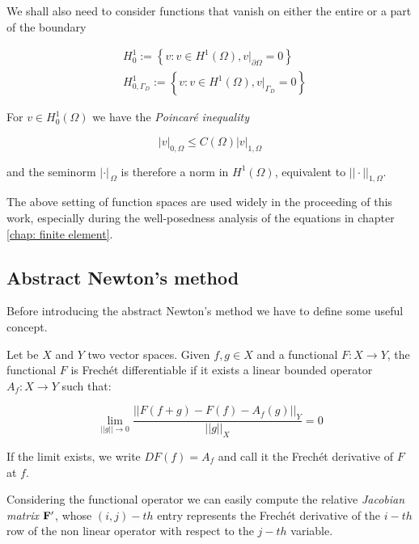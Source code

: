 We shall also need to consider functions that vanish on either the entire or a part of the boundary

\begin{align}
& H^1_0 :=  \left\{   v : v \in H^1(\Omega), v|_{\partial \Omega} = 0\right\} \label{space: h1 zero} \\
& H^1_{0,\Gamma_D} :=  \left\{   v : v \in H^1(\Omega), v|_{\Gamma_D} = 0\right\} \label{space: h1 zero gamma}
\end{align} 

For $v \in H^1_0(\Omega)$ we have the \textit{Poincar\'e inequality}

\begin{equation}
\label{eq: poincarre inequality}
|v|_{0,\Omega} \leq C(\Omega) |v|_{1,\Omega}
\end{equation}

and the seminorm $|\cdot |_{\,\Omega}$ is therefore a norm in $H^1(\Omega)$, equivalent to $||\cdot ||_{1,\Omega}$.

The above setting of function spaces are used widely in the proceeding of this work, especially during the well-posedness analysis of the equations in chapter \ref{chap: finite element}.


\subsection{Abstract Newton's method}

Before introducing the abstract Newton's method we have to define some useful concept.

\begin{Definizione}
Let be $X$ and $Y$ two vector spaces. Given $f,g \in X$ and a functional $F:X\rightarrow Y$, the functional $F$ is Frech\'et differentiable if it exists a linear bounded operator $A_f:X\rightarrow Y$ such that:

\begin{equation}
\lim_{||g||\to 0}\dfrac{||F(f+g)-F(f)-A_f(g)||_Y}{||g||_X} = 0 
\end{equation}

If the limit exists, we write $DF(f)=A_f$ and call it the Frech\'et derivative of $F$ at $f$.
\end{Definizione}


Considering the functional operator  we can easily compute the relative \textit{Jacobian matrix} $\mathbf{F}'$, whose $(i,j)-th$ entry represents the Frech\'et derivative of the $i-th$ row of the non linear operator with respect to the $j-th$ variable.

